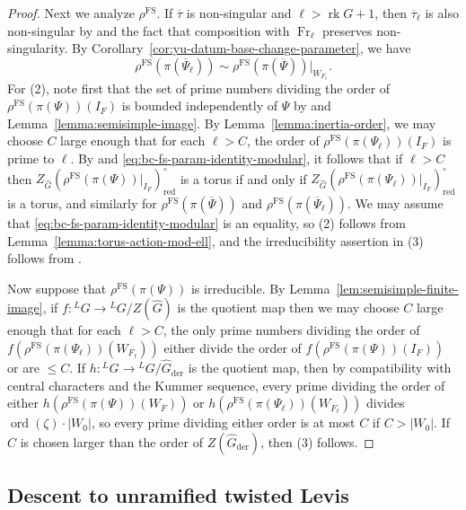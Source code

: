 \documentclass[reqno]{amsart}
\numberwithin{equation}{subsection}
\newcommand{\ol}[1]{\overline{#1}}
\newcommand{\wh}[1]{\widehat{#1}}
\newcommand{\co}{\colon}
\newcommand{\ld}{{}^L}
\DeclareMathOperator{\ord}{ord}
\DeclareMathOperator{\FS}{FS}
\DeclareMathOperator{\red}{red}
\DeclareMathOperator{\der}{der}
\DeclareMathOperator{\rk}{rk}
\DeclareMathOperator{\Fr}{Fr}
\theoremstyle{remark}
\numberwithin{equation}{subsection}
\numberwithin{figure}{subsection}
\begin{document}
\begin{proof}
Next we analyze $\rho^{\FS}$. If $\ol\tau$ is non-singular and $\ell > \rk G + 1$, then $\ol\tau_\ell$ is also non-singular by \cite[Proposition~4.3.4(1)--(2)]{Cot26b} and the fact that composition with $\Fr_\ell$ preserves non-singularity. By Corollary~\ref{cor:yu-datum-base-change-parameter}, we have
\begin{equation}\label{eq:bc-fs-param-identity-modular}
\rho^{\FS}(\pi(\ol\Psi_\ell)) \sim \rho^{\FS}(\pi(\ol\Psi))|_{W_{F_\ell}}.
\end{equation} 
For (2), note first that the set of prime numbers dividing the order of $\rho^{\FS}(\pi(\Psi))(I_F)$ is bounded independently of $\Psi$ by \cite[Lemma 2.2]{DHKM25} and Lemma~\ref{lemma:semisimple-image}. By Lemma~\ref{lemma:inertia-order}, we may choose $C$ large enough that for each $\ell > C$, the order of $\rho^{\FS}(\pi(\Psi_\ell))(I_F)$ is prime to $\ell$. By \cite[Lemma~5.3.2]{Cot26b} and \eqref{eq:bc-fs-param-identity-modular}, it follows that if $\ell > C$ then $Z_{\wh G}(\rho^{\FS}(\pi(\Psi))|_{I_F})^\circ_{\red}$ is a torus if and only if $Z_{\wh G}(\rho^{\FS}(\pi(\Psi_\ell))|_{I_F})^\circ_{\red}$ is a torus, and similarly for $\rho^{\FS}(\pi(\ol\Psi))$ and $\rho^{\FS}(\pi(\ol\Psi_\ell))$. We may assume that \eqref{eq:bc-fs-param-identity-modular} is an equality, so (2) follows from Lemma~\ref{lemma:torus-action-mod-ell}, and the irreducibility assertion in (3) follows from \cite[Lemma~10.1.7]{CF26a}.

Now suppose that $\rho^{\FS}(\pi(\Psi))$ is irreducible. By Lemma~\ref{lem:semisimple-finite-image}, if $f\co \ld G \to \ld G/Z(\wh G)$ is the quotient map then we may choose $C$ large enough that for each $\ell > C$, the only prime numbers dividing the order of $f(\rho^{\FS}(\pi(\Psi_\ell))(W_{F_\ell}))$ either divide the order of $f(\rho^{\FS}(\pi(\Psi))(I_F))$ or are $\leq C$. If $h\co \ld G \to \ld G/\wh G_{\der}$ is the quotient map, then by compatibility with central characters and the Kummer sequence, every prime dividing the order of either $h(\rho^{\FS}(\pi(\Psi))(W_F))$ or $h(\rho^{\FS}(\pi(\Psi_\ell))(W_{F_\ell}))$ divides $\ord(\zeta) \cdot |W_0|$, so every prime dividing either order is at most $C$ if $C > |W_0|$. If $C$ is chosen larger than the order of $Z(\wh G_{\der})$, then (3) follows.
\end{proof}



\subsection{Descent to unramified twisted Levis}
\end{document}
